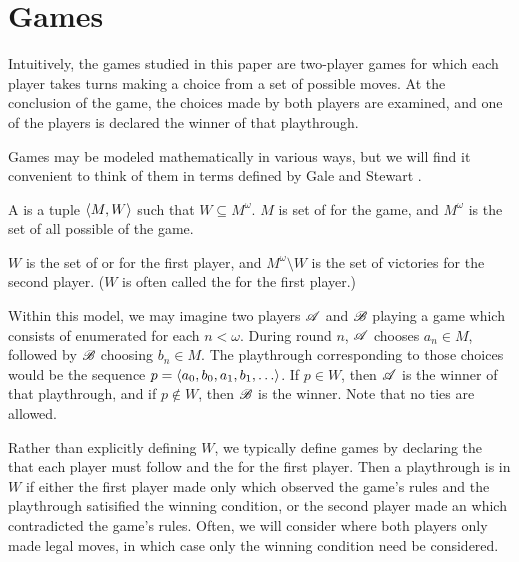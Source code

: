\section{Games}

Intuitively, the games studied in this paper are two-player games for which
each player takes turns making a choice from a set of possible moves. At
the conclusion of the game, the choices made by both players are examined,
and one of the players is declared the winner of that playthrough.

Games may be modeled mathematically in various ways,
but we will find it convenient to think of them in terms defined by
Gale and Stewart \cite{MR0054922}.

\begin{defn}
  A  is a tuple $\langle M,W\rangle$ such that
  $W\subseteq M^{\omega}$. $M$ is set of  for
  the game, and $M^{\omega}$ is the set of all possible
   of the game.

  $W$ is the set of  or  for the
  first player, and $M^{\omega}\setminus W$ is the set of victories for the
  second player. ($W$ is often called the  for the
  first player.)
\end{defn}

Within this model, we may imagine two players $\mathscr{A}$ and $\mathscr{B}$ playing a
game which consists of  enumerated for each $n<\omega$.
During round $n$, $\mathscr{A}$ chooses $a_n\in M$, followed by $\mathscr{B}$ choosing
$b_n\in M$. The playthrough corresponding to those choices would be
the sequence $p = \<a_0,b_0,a_1,b_1,\dots\>$. If $p\in W$, then $\mathscr{A}$
is the winner of that playthrough, and if $p\not\in W$, then $\mathscr{B}$ is
the winner. Note that no ties are allowed.

Rather than explicitly defining $W$, we
typically define games by declaring the  that each player must
follow and the  for the first player.
Then a playthrough is in $W$ if either
the first player made only  which observed the game's rules
and the playthrough satisified the winning condition, or the second player
made an  which contradicted the game's rules.
Often, we will consider  where both players only
made legal moves, in which case only the winning condition need be considered.

